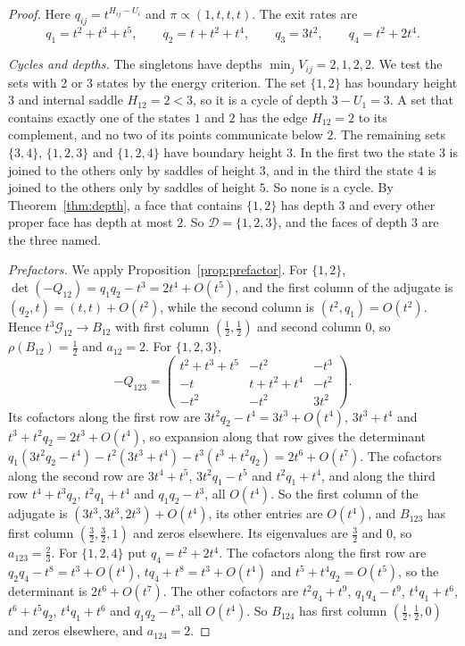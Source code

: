 \ifarxivbuild
\begin{proof}
Here $q_{ij}=t^{H_{ij}-U_i}$ and $\pi\propto(1,t,t,t)$. The exit rates are
\[
 q_1=t^2+t^3+t^5,\qquad q_2=t+t^2+t^4,\qquad q_3=3t^2,\qquad q_4=t^2+2t^4 .
\]

\emph{Cycles and depths.} The singletons have depths $\min_jV_{ij}=2,1,2,2$. We
test the sets with 2 or 3 states by the energy criterion. The set $\{1,2\}$
has boundary height $3$ and internal saddle $H_{12}=2<3$, so it is a cycle of
depth $3-U_1=3$. A set that contains exactly one of the states $1$ and $2$ has
the edge $H_{12}=2$ to its complement, and no two of its points communicate
below $2$. The remaining sets $\{3,4\}$, $\{1,2,3\}$ and $\{1,2,4\}$ have
boundary height $3$. In the first two the state $3$ is joined to the others
only by saddles of height $3$, and in the third the state $4$ is joined to the
others only by saddles of height $5$. So none is a cycle. By
Theorem~\ref{thm:depth}, a face that contains $\{1,2\}$ has depth $3$ and every
other proper face has depth at most $2$. So $\mathcal D=\{1,2,3\}$, and the
faces of depth $3$ are the three named.

\emph{Prefactors.} We apply Proposition~\ref{prop:prefactor}. For $\{1,2\}$,
$\det(-Q_{12})=q_1q_2-t^3=2t^4+O(t^5)$, and the first column of the adjugate is
$(q_2,t)=(t,t)+O(t^2)$, while the second column is $(t^2,q_1)=O(t^2)$. Hence
$t^3\mathcal G_{12}\to B_{12}$ with first column $(\frac12,\frac12)$ and second
column $0$, so $\rho(B_{12})=\frac12$ and $a_{12}=2$. For $\{1,2,3\}$,
\[
 -Q_{123}=\begin{pmatrix}t^2+t^3+t^5&-t^2&-t^3\\-t&t+t^2+t^4&-t^2\\-t^2&-t^2&3t^2\end{pmatrix}.
\]
Its cofactors along the first row are $3t^2q_2-t^4=3t^3+O(t^4)$, $3t^3+t^4$
and $t^3+t^2q_2=2t^3+O(t^4)$, so expansion along that row gives the determinant
$q_1(3t^2q_2-t^4)-t^2(3t^3+t^4)-t^3(t^3+t^2q_2)=2t^6+O(t^7)$. The cofactors
along the second row are $3t^4+t^5$, $3t^2q_1-t^5$ and $t^2q_1+t^4$, and
along the third row $t^4+t^3q_2$, $t^2q_1+t^4$ and $q_1q_2-t^3$, all
$O(t^4)$. So the first column of the adjugate is $(3t^3,3t^3,2t^3)+O(t^4)$, its
other entries are $O(t^4)$, and $B_{123}$ has first column
$(\frac32,\frac32,1)$ and zeros elsewhere. Its eigenvalues are $\frac32$ and
$0$, so $a_{123}=\frac23$. For $\{1,2,4\}$ put $q_4=t^2+2t^4$. The cofactors
along the first row are $q_2q_4-t^8=t^3+O(t^4)$, $tq_4+t^8=t^3+O(t^4)$ and
$t^5+t^4q_2=O(t^5)$, so the determinant is $2t^6+O(t^7)$. The other cofactors
are $t^2q_4+t^9$, $q_1q_4-t^9$, $t^4q_1+t^6$, $t^6+t^5q_2$, $t^4q_1+t^6$ and
$q_1q_2-t^3$, all $O(t^4)$. So $B_{124}$ has first column $(\frac12,\frac12,0)$
and zeros elsewhere, and $a_{124}=2$.


\end{proof}
